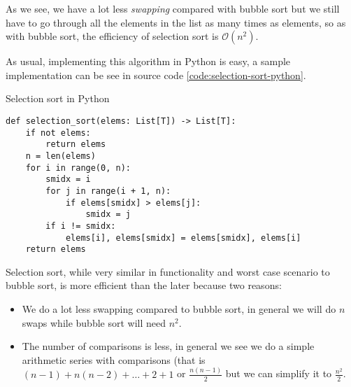 \documentclass[main.tex]{subfiles}
\begin{document}
\begin{figure}[htp]
\end{figure}

As we see, we have a lot less \textit{swapping} compared with bubble sort but we still have to go through all the elements in the list as many times as elements, so as with bubble sort, the efficiency of selection sort is $\mathcal{O}(n^2)$.

As usual, implementing this algorithm in Python is easy, a sample implementation can be see in source code \ref{code:selection-sort-python}.

\begin{listing}
\caption{Selection sort in Python}
\label{code:selection-sort-python}
\begin{verbatim}
def selection_sort(elems: List[T]) -> List[T]:
    if not elems:
        return elems
    n = len(elems)
    for i in range(0, n):
        smidx = i
        for j in range(i + 1, n):
            if elems[smidx] > elems[j]:
                smidx = j
        if i != smidx:
            elems[i], elems[smidx] = elems[smidx], elems[i]
    return elems
\end{verbatim}
\end{listing}

Selection sort, while very similar in functionality and worst case scenario to bubble sort, is more efficient than the later because two reasons:

\begin{itemize}
    \item We do a lot less swapping compared to bubble sort, in general we will do $n$ swaps while bubble sort will need $n^2$.
    \item The number of comparisons is less, in general we see we do a simple arithmetic series with comparisons (that is $(n-1)+n(n-2)+\dots+2+1$ or $\frac{n(n-1)}{2}$ but we can simplify it to $\frac{n^2}{2}$.
\end{itemize}
\end{document}

